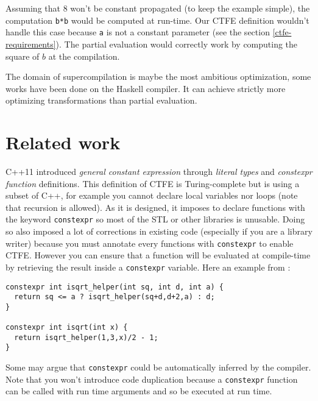 \documentclass[a4paper,11pt]{article}
\begin{document}
Assuming that $8$ won't be constant propagated (to keep the example simple), the computation \lstinline{b*b} would be computed at run-time. Our CTFE definition wouldn't handle this case because \lstinline{a} is not a constant parameter (see the section \ref{ctfe-requirements}). The partial evaluation would correctly work by computing the square of $b$ at the compilation.
\newline

The domain of supercompilation is maybe the most ambitious optimization, some works have been done on the Haskell compiler\cite{Bolingbroke:2010:SE:2088456.1863540}. It can achieve strictly more optimizing transformations than partial evaluation\cite{Sorensen94towardsunifying}.

\section{Related work}
\label{related-work}

C++11 introduced \textit{general constant expression} \cite{DosReis:2010:GCE:1774088.1774537} through \textit{literal types} and \textit{constexpr function} definitions. This definition of CTFE is Turing-complete but is using a subset of C++, for example you cannot declare local variables nor loops (note that recursion is allowed). As it is designed, it imposes to declare functions with the keyword \lstinline{constexpr} so most of the STL or other libraries is unusable. Doing so also imposed a lot of corrections in existing code (especially if you are a library writer) because you must annotate every functions with \lstinline{constexpr} to enable CTFE. However you can ensure that a function will be evaluated at compile-time by retrieving the result inside a \lstinline{constexpr} variable. Here an example from \cite{DosReis:2010:GCE:1774088.1774537}:

\begin{lstlisting}
constexpr int isqrt_helper(int sq, int d, int a) {
  return sq <= a ? isqrt_helper(sq+d,d+2,a) : d;
}

constexpr int isqrt(int x) {
  return isqrt_helper(1,3,x)/2 - 1;
}
\end{lstlisting}

Some may argue that \lstinline{constexpr} could be automatically inferred by the compiler. Note that you won't introduce code duplication because a \lstinline{constexpr} function can be called with run time arguments and so be executed at run time.
\newline
\end{document}
